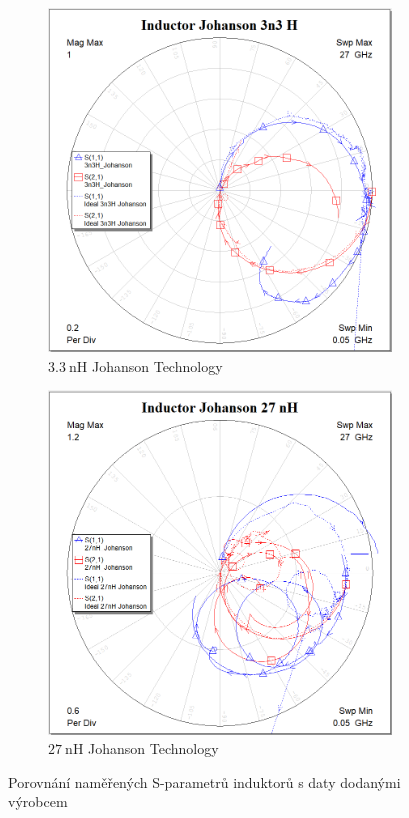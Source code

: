 \documentclass[11pt,a4paper]{article}
\begin{document}
\begin{figure}[!ht]
    \centering
\begin{subfigure}{0.45\textwidth}
    \centering
    \includegraphics[width=\textwidth]{src/inductor-3n3H-Johanson.png}
    \caption{$3.3\ \mathrm{nH}$ Johanson Technology}
\end{subfigure}
\begin{subfigure}{0.45\textwidth}
    \centering
    \includegraphics[width=\textwidth]{src/inductor-27nH-Johanson.png}
    \caption{$27\ \mathrm{nH}$ Johanson Technology}
\end{subfigure}
\caption{\label{fig:inductors}Porovnání naměřených S-parametrů induktorů s daty dodanými výrobcem}
\end{figure}
\end{document}
